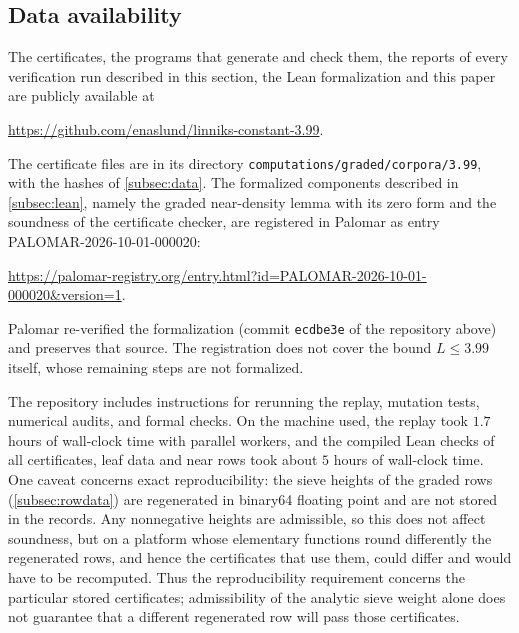 \subsection{Data availability}
The certificates, the programs that generate and check them, the reports of every
verification run described in this section, the Lean formalization and this paper are publicly
available at
\begin{center}\url{https://github.com/enaslund/linniks-constant-3.99}.\end{center}
The certificate files are in its directory \texttt{computations/graded/corpora/3.99}, with the
hashes of \cref{subsec:data}.
The formalized components described in \cref{subsec:lean}, namely the graded near-density lemma
with its zero form and the soundness of the certificate checker, are registered in Palomar as entry
PALOMAR-2026-10-01-000020:
\begin{center}\url{https://palomar-registry.org/entry.html?id=PALOMAR-2026-10-01-000020&version=1}.\end{center}
Palomar re-verified the formalization (commit \texttt{ecdbe3e} of the repository above) and
preserves that source. The registration does not cover the bound $L\le3.99$ itself, whose
remaining steps are not formalized.

The repository includes instructions for rerunning the replay, mutation tests,
numerical audits, and formal checks. On the machine used,
the replay took $1.7$ hours of wall-clock time with parallel workers, and the compiled Lean checks
of all certificates, leaf data and near rows took about $5$ hours of wall-clock time. One caveat
concerns exact reproducibility: the sieve heights of the graded rows (\cref{subsec:rowdata}) are
regenerated in binary64 floating point and are not stored in the records. Any nonnegative heights
are admissible, so this does not affect soundness, but on a platform whose elementary functions
round differently the regenerated rows, and hence the certificates that use them, could differ and
would have to be recomputed. Thus the reproducibility requirement concerns the
particular stored certificates; admissibility of the analytic sieve weight alone does
not guarantee that a different regenerated row will pass those certificates.
